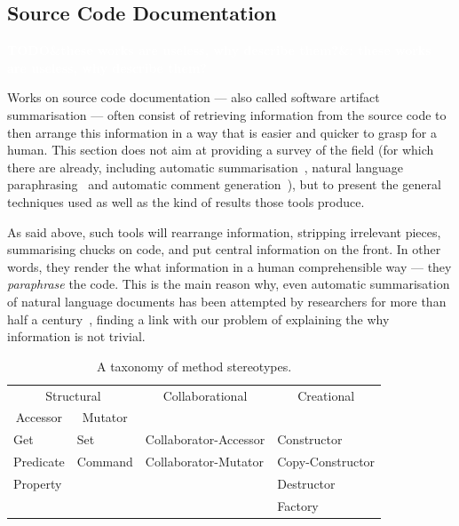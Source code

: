 \documentclass[a4paper,11pt]{sdm_internship}
\newcommand{\todo}[1]{\colorbox{Red!75}{\textcolor{white}{\textbf{TODO\ifx&#1&\else: #1\fi}}}}
\theoremstyle{definition}
\begin{document}
\subsection{Source Code Documentation}%
\label{ssec:doc_generation}
\todo{these works are useless, why describe them?}

Works on source code documentation --- also called software artifact summarisation --- often consist of retrieving information from the source code to then arrange this information in a way that is easier and quicker to grasp for a human.
This section does not aim at providing a survey of the field (for which there are already, including automatic summarisation~\cite{jones2007automatic,nazar2016summarizing}, natural language paraphrasing~\cite{neubig2016survey} and automatic comment generation~\cite{wang2018comment}), but to present the general techniques used as well as the kind of results those tools produce.

As said above, such tools will rearrange information, stripping irrelevant pieces, summarising chucks on code, and put central information on the front.
In other words, they render the what information in a human comprehensible way --- they \emph{paraphrase} the code.
This is the main reason why, even automatic summarisation of natural language documents has been attempted by researchers for more than half a century~\cite{jones2007automatic}, finding a link with our problem of explaining the why information is not trivial.

\begin{table}
  \centering
  \begin{tabular}{llll}
    \toprule
    \multicolumn{2}{c}{Structural} & \multicolumn{1}{c}{Collaborational} & \multicolumn{1}{c}{Creational} \\
    \multicolumn{1}{c}{Accessor} & \multicolumn{1}{c}{Mutator} & & \\
    \midrule
    Get & Set & Collaborator-Accessor & Constructor \\
    Predicate & Command & Collaborator-Mutator & Copy-Constructor \\
    Property & & & Destructor \\
     & & & Factory \\
    \bottomrule
  \end{tabular}
  \caption{A taxonomy of method stereotypes.}%
  \label{tab:dragan_taxonomy}
\end{table}
\end{document}
